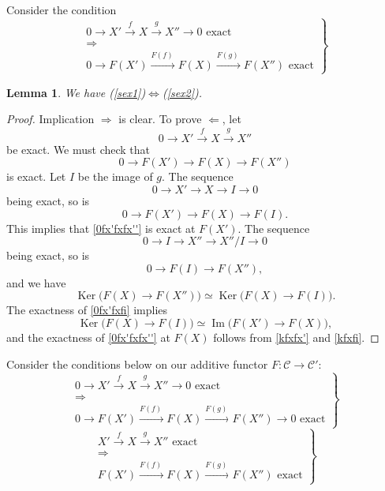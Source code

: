 \documentclass[12pt]{article}
\newtheorem{lem}[thm]{Lemma}
\theoremstyle{remark}
\theoremstyle{definition}
\newcommand{\C}{\mathcal C}
\newcommand{\si}{\Leftarrow}
\newcommand{\ssi}{\Leftrightarrow}
\newcommand{\then}{\Rightarrow}
\newcommand{\xr}{\xrightarrow}
\DeclareMathOperator{\Ima}{Im}
\DeclareMathOperator{\Ker}{Ker}
\begin{document}
Consider the condition
%
\begin{equation}\label{sex2}
\left.
\begin{matrix}
0\to X'\xr fX\xr gX''\to0\text{ exact }\\ 
\then\\ 
0\to F(X')\overset{F(f)\ }{\longrightarrow}F(X)\overset{F(g)\ }{\longrightarrow}F(X'')\text{ exact}
\end{matrix}
\right\}
\end{equation}

\begin{lem}\label{817a}
We have (\ref{sex1})$\ssi$(\ref{sex2}). 
\end{lem}

\begin{proof}
Implication $\then$ is clear. To prove $\si$, let 
$$
0\to X'\xr fX\xr gX''
$$
be exact. We must check that 
%
\begin{equation}\label{0fx'fxfx''}
0\to F(X')\to F(X)\to F(X'')
\end{equation} 
% 
is exact. Let $I$ be the image of $g$. The sequence 
$$ 
0\to X'\to X\to I\to0
$$ 
being exact, so is 
%
\begin{equation}\label{0fx'fxfi}
0\to F(X')\to F(X)\to F(I).
\end{equation} 
% 
This implies that \eqref{0fx'fxfx''} is exact at $F(X')$. The sequence 
$$ 
0\to I\to X''\to X''/I\to0
$$  
being exact, so is 
$$ 
0\to F(I)\to F(X''),
$$  
and we have 
%
\begin{equation}\label{kfxfx'}
\Ker\big(F(X)\to F(X'')\big)\simeq\Ker\big(F(X)\to F(I)\big).
\end{equation} 
% 
The exactness of \eqref{0fx'fxfi} implies 
%
\begin{equation}\label{kfxfi}
\Ker\big(F(X)\to F(I)\big)\simeq\Ima\big(F(X')\to F(X)\big), 
\end{equation} 
% 
and the exactness of \eqref{0fx'fxfx''} at $F(X)$ follows from \eqref{kfxfx'} and \eqref{kfxfi}. 
\end{proof} 

Consider the conditions below on our additive functor $F:\C\to\C'$:
%
\begin{equation}\label{ex1}
\left.
\begin{matrix}
0\to X'\xr fX\xr gX''\to0\text{ exact }\\ 
\then\\ 
0\to F(X')\overset{F(f)\ }{\longrightarrow}F(X)\overset{F(g)\ }{\longrightarrow}F(X'')\to0\text{ exact}
\end{matrix}
\right\}
\end{equation}
%
\begin{equation}\label{ex2}
\left.
\begin{matrix}
X'\xr fX\xr gX''\text{ exact }\\ 
\then\\ 
F(X')\overset{F(f)\ }{\longrightarrow}F(X)\overset{F(g)\ }{\longrightarrow}F(X'')\text{ exact}
\end{matrix}
\right\}
\end{equation}
\end{document}
